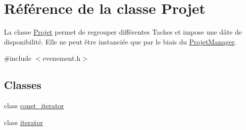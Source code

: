 \hypertarget{class_projet}{}\section{Référence de la classe Projet}
\label{class_projet}


La classe \hyperlink{class_projet}{Projet} permet de regrouper différentes Taches et impose une dâte de disponibilité. Elle ne peut être instanciée que par le biais du \hyperlink{class_projet_manager}{Projet\+Manager}.  




{\ttfamily \#include $<$evenement.\+h$>$}

\subsection*{Classes}
\begin{DoxyCompactItemize}
\item 
class \hyperlink{class_projet_1_1const__iterator}{const\+\_\+iterator}
\item 
class \hyperlink{class_projet_1_1iterator}{iterator}
\end{DoxyCompactItemize}

